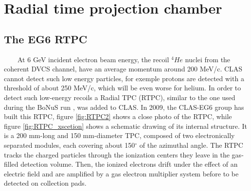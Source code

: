 \chapter{Radial time projection chamber}


\section{The EG6 RTPC}

~~~~At 6 GeV incident electron beam energy, the recoil $^{4}He$ nuclei from the coherent DVCS channel, have an average momentum around 200 MeV/c. CLAS cannot detect such low energy particles, for exemple protons are detected with a threshold of about 250 MeV/c, which will be even worse for helium. In order to detect such low-energy recoils a Radial TPC (RTPC), similar to the one used during the BoNuS run \cite{BONUS}, was added to CLAS. In 2009, the CLAS-EG6 group \cite{proposal} has built this RTPC, figure \ref{fig:RTPC2} shows a close photo of the RTPC, while figure \ref{fig:RTPC_xscetion} shows a schematic drawing of its internal structure. It is a 200 mm-long and 150 mm-diameter TPC, composed of two electronically separated modules, each covering about 150$^{\circ}$ of the azimuthal angle. The RTPC tracks the charged particles through the ionization centers they leave in the gas-filled detection volume. Then, the ionized electrons drift under the effect of an electric field and are amplified by a gas electron multiplier system before to be detected on collection pads.


